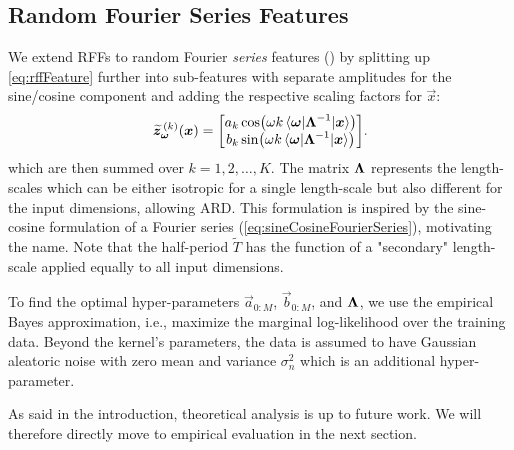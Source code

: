 \subsection{Random Fourier Series Features}
	We extend \acp{RFF} to random Fourier \emph{series} features () by splitting up \cref{eq:rffFeature} further into sub-features with separate amplitudes for the sine/cosine component and adding the respective scaling factors for $\vec{x}$:
	\begin{equation}
		\widetilde{\bm{z}}_{\bm{\omega}}^{\,(k)}(\bm{x}) =
			\begin{bmatrix}
				a_k \cos(\omega k \mel{\bm{\omega}}{\bm{\mathrm{\Lambda}}^{-1}}{\bm{x}}) \\
				b_k \sin(\omega k \mel{\bm{\omega}}{\bm{\mathrm{\Lambda}}^{-1}}{\bm{x}})
			\end{bmatrix}\!.
		\label{eq:rfsf}
	\end{equation}
	which are then summed over $k = 1, 2, \dots, K$.
	The matrix $\bm{\mathrm{\Lambda}}$ represents the length-scales which can be either isotropic for a single length-scale but also different for the input dimensions, allowing \ac{ARD}.
	This formulation is inspired by the sine-cosine formulation of a Fourier series (\cref{eq:sineCosineFourierSeries}), motivating the name.
	Note that the half-period $\tilde{T}$ has the function of a "secondary" length-scale applied equally to all input dimensions.

	To find the optimal hyper-parameters $\vec{a}_{0:M}$, $\vec{b}_{0:M}$, and $\bm{\mathrm{\Lambda}}$, we use the empirical Bayes approximation\cite[p.\,165]{bishopPatternRecognitionMachine2006}, i.e., maximize the marginal log-likelihood over the training data.
	Beyond the kernel's parameters, the data is assumed to have Gaussian aleatoric noise with zero mean and variance $\sigma_n^2$ which is an additional hyper-parameter.

	As said in the introduction, theoretical analysis is up to future work.
	We will therefore directly move to empirical evaluation in the next section.


